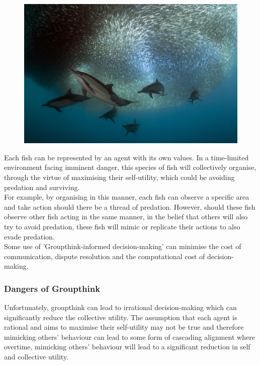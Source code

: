 \begin{figure}[h]           %
	\centering				%
	\includegraphics[scale = 0.1]{fish.jpg}			%
	\label{fig:example}			%
\end{figure}

Each fish can be represented by an agent with its own values. In a time-limited environment facing imminent danger, this species of fish will collectively organise, through the virtue of maximising their self-utility, which could be avoiding predation and surviving.\\

For example, by organising in this manner, each fish can observe a specific area and take action should there be a thread of predation. However, should these fish observe other fish acting in the same manner, in the belief that others will also try to avoid predation, these fish will mimic or replicate their actions to also evade predation. \\

Some use of 'Groupthink-informed decision-making' can minimise the cost of communication, dispute resolution and the computational cost of decision-making. 

\subsubsection{Dangers of Groupthink}

Unfortunately, groupthink can lead to irrational decision-making which can significantly reduce the collective utility. The assumption that each agent is rational and aims to maximise their self-utility may not be true and therefore mimicking others' behaviour can lead to some form of cascading alignment where overtime, mimicking others' behaviour will lead to a significant reduction in self and collective utility. \\

